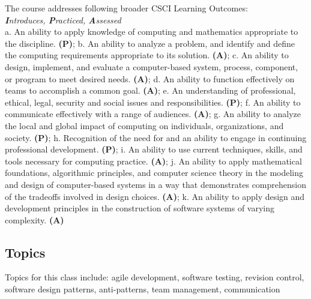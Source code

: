 \documentclass[12pt]{article}
\begin{document}
  The course addresses following broader CSCI Learning Outcomes: \\
  \textit{\textbf{I}ntroduces, \textbf{P}racticed, \textbf{A}ssessed} \\
    a. An ability to apply knowledge of computing and mathematics appropriate to the discipline. \textbf{(P)}; b.  An ability to analyze a problem, and identify and define the computing requirements appropriate to its solution. \textbf{(A)}; c. An ability to design, implement, and evaluate a computer-based system, process, component, or program to meet desired needs. \textbf{(A)}; d. An ability to function effectively on teams to accomplish a common goal. \textbf{(A)}; e. An understanding of professional, ethical, legal, security and social issues and responsibilities. \textbf{(P)}; f. An ability to communicate effectively with a range of audiences. \textbf{(A)}; g. An ability to analyze the local and global impact of computing on individuals, organizations, and society. \textbf{(P)}; h. Recognition of the need for and an ability to engage in continuing professional development. \textbf{(P)}; i. An ability to use current techniques, skills, and tools necessary for computing practice. \textbf{(A)}; j. An ability to apply mathematical foundations, algorithmic principles, and computer science theory in the modeling and design of computer-based systems in a way that demonstrates comprehension of the tradeoffs involved in design choices. \textbf{(A)}; k. An ability to apply design and development principles in the construction of software systems of varying complexity. \textbf{(A)}

  \subsection*{Topics}
  \noindent
  Topics for this class include: agile development, software testing, revision control, software design patterns, anti-patterns, team management, communication
  
\end{document}
